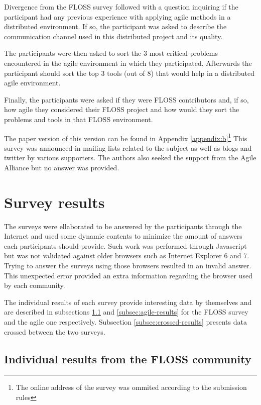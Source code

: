 \documentclass[lnbip]{svmultln}
\begin{document}
Divergence from the FLOSS survey followed with a question inquiring if
the participant had any previous experience with applying agile
methods in a distributed environment. If so, the participant was asked
to describe the communication channel used in this distributed project
and its quality.

The participants were then asked to sort the 3 most critical problems
encountered in the agile environment in which they
participated. Afterwards the participant should sort the top 3 tools
(out of 8) that would help in a distributed agile environment.

Finally, the participants were asked if they were FLOSS contributors
and, if so, how agile they considered their FLOSS project and how
would they sort the problems and tools in that FLOSS environment.

The paper version of this version can be found in Appendix
\ref{appendix:b}\footnote{The online address of the survey was ommited
  according to the submission rules}
This survey was announced in mailing lists related to the subject as
well as blogs and twitter by various supporters. The authors also
seeked the support from the Agile Alliance but no answer was provided.

\section{Survey results}
\label{sec:results}

The surveys were ellaborated to be answered by the participants
through the Internet and used some dynamic contents to minimize the
amount of answers each participants should provide. Such work was
performed through Javascript but was not validated against older
browsers such as Internet Explorer 6 and 7. Trying to answer the
surveys using those browsers resulted in an invalid answer. This
unexpected error provided an extra information regarding the browser
used by each community.

The individual results of each survey provide interesting data by
themselves and are described in subsections \ref{subsec:floss-results}
and \ref{subsec:agile-results} for the FLOSS survey and the agile one
respectively. Subsection \ref{subsec:crossed-results} presents data crossed
between the two surveys.

\subsection{Individual results from the FLOSS community}
\label{subsec:floss-results}
\end{document}
